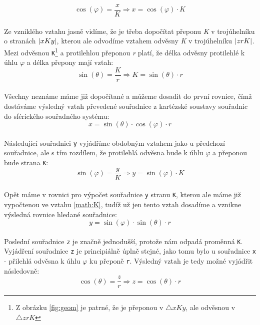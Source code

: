 \begin{equation}
 \cos (\varphi) = \frac{x}{K}  \Rightarrow x = \cos (\varphi) \cdot K
\end{equation}
\\
Ze vzniklého vztahu jasně vidíme, že je třeba dopočítat přeponu \textit{K} v trojúhelníku  o stranách $\arrowvert xKy\arrowvert$, kterou ale odvodíme vztahem odvěsny \textit{K} v trojúhelníku $\arrowvert zrK\arrowvert$. Mezi odvěsnou \texttt{K}\footnote{Z obrázku \ref{fig:geom} je patrné, že je přeponou v $\bigtriangleup xKy$, ale odvěsnou v $\bigtriangleup zrK$} a protilehlou přeponou \textit{r} platí, že délka odvěsny protilehlé k úhlu $\varphi$ a délka přepony \cite{Goniometrie} mají vztah:
\\
\begin{equation}
\label{math:K}
\sin (\theta) = \frac{K}{r}  \Rightarrow K = \sin (\theta) \cdot r
\end{equation}
\\
Všechny neznáme máme již dopočítané a můžeme dosadit do první rovnice, čímž dostáváme výsledný vztah převedené souřadnice z kartézské soustavy souřadnic do sférického souřadného systému:
\\
\begin{equation}
\label{math:x}
x = \sin (\theta) \cdot  \cos (\varphi) \cdot r
\end{equation}
\\
Následující souřadnici \texttt{y} vyjádříme obdobným vztahem jako u předchozí souřadnice, ale s tím rozdílem, že protilehlá odvěsna bude k úhlu $\varphi$ a přeponou bude strana \texttt{K}:
\\
\begin{displaymath}
\sin (\varphi) = \frac{y}{K}  \Rightarrow y = \sin (\varphi) \cdot K
\end{displaymath}
\\
Opět máme v rovnici pro výpočet souřadnice \texttt{y} stranu \texttt{K}, kterou ale máme již vypočtenou ve vztahu \ref{math:K}, tudíž už jen tento vztah dosadíme a vznikne výsledná rovnice hledané  souřadnice:
\\
\begin{equation}
\label{math:y}
y = \sin (\varphi) \cdot \sin (\theta) \cdot r
\end{equation}
\\
Poslední souřadnice \texttt{z} je značně jednodušší, protože nám odpadá proměnná \texttt{K}. Vyjádření souřadnice \texttt{z} je principiálně úplně stejné, jako tomu bylo u souřadnice \texttt{x} - přilehlá odvěsna k úhlu $\varphi$ ku přeponě \texttt{r}. Výsledný vztah je tedy možné vyjádřit následovně:
\\
\begin{equation}
\label{math:z}
\cos (\theta) = \frac{z}{r} \Rightarrow z = \cos (\theta) \cdot r
\end{equation}

